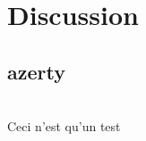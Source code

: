 \documentclass[../main.tex]{subfiles}
\begin{document}
\chapter{Discussion}

\section{azerty}

\lipsum[1-2]\\

Ceci n'est qu'un test\cite{DUMMY:001}
\end{document}
